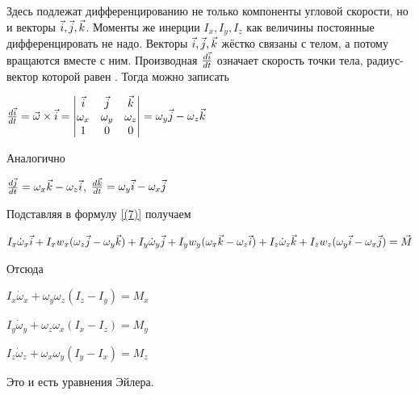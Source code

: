 \documentclass{article}
\begin{document}
Здесь подлежат дифференцированию не только компоненты угловой скорости, но и векторы $\vec{i}, \space \vec{j}, \space \vec{k}$. Моменты же инерции $I_x, I_y, I_z$ как величины постоянные дифференцировать не надо. Векторы $\vec{i}, \space \vec{j}, \space \vec{k}$ жёстко связаны с телом, а потому вращаются вместе с ним. Производная $\frac{d\space\vec{i}}{dt}$ означает скорость точки тела, радиус-вектор которой равен . Тогда можно записать

\begin{center}
$\frac{d\space\vec{i}}{dt} = \vec{\omega} \times \vec{i} = \begin{vmatrix}
\vec{i} & \vec{j} & \vec{k} \\
\omega_x & \omega_y & \omega_z \\
1 & 0 & 0
\end{vmatrix} 
= \omega_y\vec{j} - \omega_z\vec{k}$
\end{center}

Аналогично 

\begin{center}
$\frac{d\space\vec{j}}{dt} = \omega_x\vec{k} - \omega_z\vec{i}$, \space
$\frac{d\space\vec{k}}{dt} = \omega_y\vec{i} - \omega_x\vec{j}$
\end{center}

Подставляя в формулу \ref{(7)} получаем

\begin{center}
$
I_x{\displaystyle {\dot {\omega }}_{x}} \vec{i} + I_x\space w_x (\space \omega_z\vec{j} \space -\omega_y \vec{k} \space)+ 
I_y{\displaystyle {\dot {\omega }}_{y}} \vec{j} + I_y\space w_y (\space \omega_x\vec{k} \space -\omega_z \vec{i} \space)+ 
I_z{\displaystyle {\dot {\omega }}_{z}} \vec{k} + I_z\space w_z (\space \omega_y\vec{i} \space -\omega_x \vec{j} \space)
= \vec{M}$
\end{center}

Отсюда 
\begin{center}
$I_x{\displaystyle {\dot {\omega }}_{x}} + \omega_y\omega_z(I_z - I_y) = M_x$
\end{center}
\begin{center}
$I_y{\displaystyle {\dot {\omega }}_{y}} + \omega_z\omega_x(I_x - I_z) = M_y$
\end{center}
\begin{center}
$I_z{\displaystyle {\dot {\omega }}_{z}} + \omega_x\omega_y(I_y - I_x) = M_z$
\end{center}

Это и есть уравнения Эйлера. 
\end{document}

